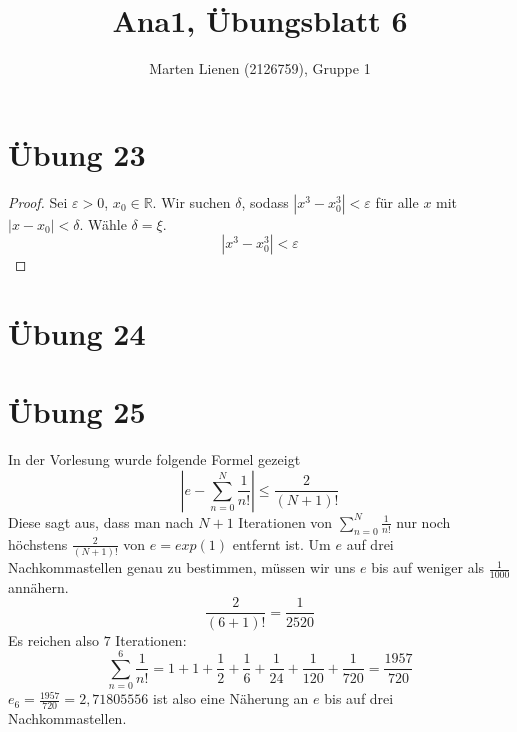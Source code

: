 \documentclass[a4paper,10pt]{article}
\title{Ana1, Übungsblatt 6}
\author{Marten Lienen (2126759), Gruppe 1}
\begin{document}
\maketitle

\section*{Übung 23}

\begin{proof}
 Sei $\varepsilon > 0$, $x_0 \in \mathbb{R}$.
 Wir suchen $\delta$, sodass $|x^3 - x_0^3| < \varepsilon$ für alle $x$ mit $|x - x_0| < \delta$.
 Wähle $\delta = \xi$.
 \begin{equation}
  |x^3 - x_0^3| < \varepsilon
 \end{equation}

\end{proof}

\section*{Übung 24}

\section*{Übung 25}

In der Vorlesung wurde folgende Formel gezeigt
\begin{equation}
 |e - \sum_{n = 0}^N \frac{1}{n!}| \le \frac{2}{(N + 1)!}
\end{equation}
Diese sagt aus, dass man nach $N + 1$ Iterationen von $\sum_{n = 0}^N \frac{1}{n!}$ nur noch höchstens $\frac{2}{(N + 1)!}$ von $e = exp(1)$ entfernt ist.
Um $e$ auf drei Nachkommastellen genau zu bestimmen, müssen wir uns $e$ bis auf weniger als $\frac{1}{1000}$ annähern.
\begin{equation}
 \frac{2}{(6 + 1)!} = \frac{1}{2520}
\end{equation}
Es reichen also $7$ Iterationen:
\begin{equation}
 \sum_{n = 0}^6 \frac{1}{n!} = 1 + 1 + \frac{1}{2} + \frac{1}{6} + \frac{1}{24} + \frac{1}{120} + \frac{1}{720} = \frac{1957}{720}
\end{equation}
$e_6 = \frac{1957}{720} = 2,71805556$ ist also eine Näherung an $e$ bis auf drei Nachkommastellen.
\end{document}
